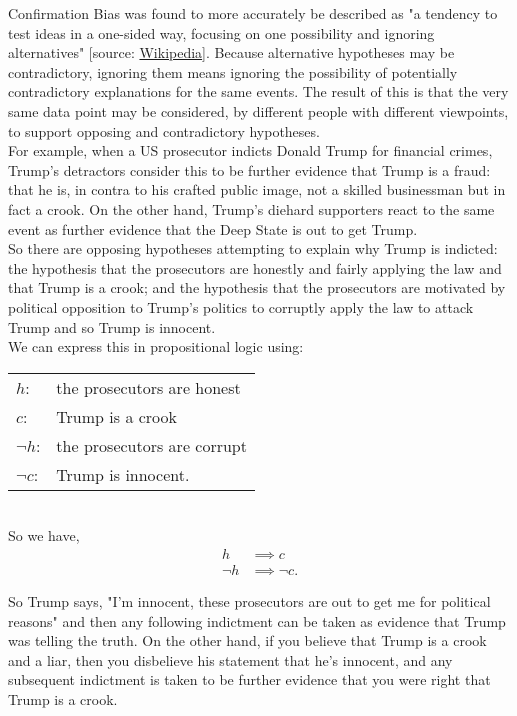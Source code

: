 \documentclass[../MathsNotesBase.tex]{subfiles}
\date{\vspace{-6ex}}
\begin{document}
	Confirmation Bias was found to more accurately be described as "a tendency to test ideas in a one-sided way, focusing on one possibility and ignoring alternatives" [source: \href{https://en.wikipedia.org/wiki/Confirmation_bias}{Wikipedia}]. Because alternative hypotheses may be contradictory, ignoring them means ignoring the possibility of potentially contradictory explanations for the same events. The result of this is that the very same data point may be considered, by different people with different viewpoints, to support opposing and contradictory hypotheses.\\
	
	For example, when a US prosecutor indicts Donald Trump for financial crimes, Trump's detractors consider this to be further evidence that Trump is a fraud: that he is, in contra to his crafted public image, not a skilled businessman but in fact a crook. On the other hand, Trump's diehard supporters react to the same event as further evidence that the Deep State is out to get Trump.\\
	
	So there are opposing hypotheses attempting to explain why Trump is indicted: the hypothesis that the prosecutors are honestly and fairly applying the law and that Trump is a crook; and the hypothesis that the prosecutors are motivated by political opposition to Trump's politics to corruptly apply the law to attack Trump and so Trump is innocent.\\
	
	We can express this in propositional logic using:\\
	
	\begin{tabular}[h!]{*2l}
		$h$: & the prosecutors are honest \\
		$c$: & Trump is a crook \\
		$\lnot h$: & the prosecutors are corrupt \\
		$\lnot c$: & Trump is innocent.
	\end{tabular}\\

	So we have,
	\[\begin{aligned}
		h &\implies c \\
		\lnot h &\implies \lnot c.
	\end{aligned}\]

	So Trump says, "I'm innocent, these prosecutors are out to get me for political reasons" and then any following indictment can be taken as evidence that Trump was telling the truth. On the other hand, if you believe that Trump is a crook and a liar, then you disbelieve his statement that he's innocent, and any subsequent indictment is taken to be further evidence that you were right that Trump is a crook.\\
	
\end{document}
